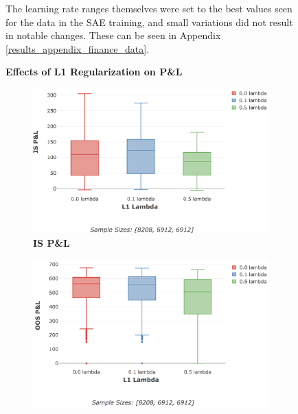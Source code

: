 \documentclass[a4paper,11pt,oneside]{article}
\theoremstyle{plain}
\theoremstyle{definition}
\begin{document}
\begin{figure}[H]
{		\newline\newline
		The learning rate ranges themselves were set to the best values seen for the data in the SAE training, and small variations did not result in notable changes. These can be seen in Appendix \ref{results_appendix_finance_data}.}
		\label{figure-actual_pl_lr_epochs}
	\end{figure}
	
	\begin{figure}[H]
		\centering
		\textbf{Effects of L1 Regularization on P\&L}
		\begin{subfigure}{.5\textwidth}
			\includegraphics[scale=0.305]{images/results/8_6_complexity/is_actual_pl_reg.png}
			\caption{\textbf{IS P\&L} }
			\label{figure-is_actual_pl_reg}
		\end{subfigure}%
		\begin{subfigure}{.5\textwidth}
			\includegraphics[scale=0.3]{images/results/8_6_complexity/oos_actual_pl_reg.png}

\end{subfigure}
\end{figure}
\end{document}
